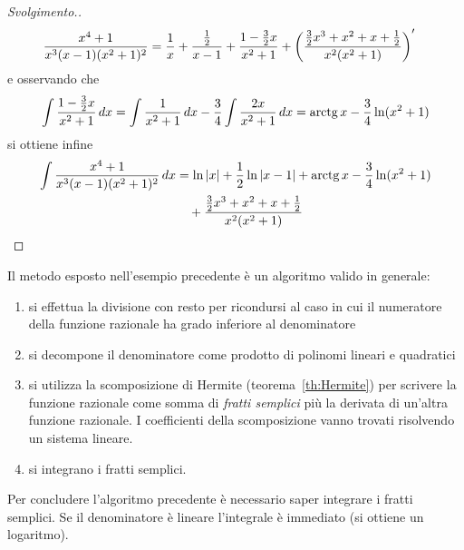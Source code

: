 \begin{proof}[Svolgimento.]
\begin{align*}
\frac{x^4+1}{x^3(x-1)(x^2+1)^2}
&= \frac{1}{x} + \frac{\frac 1 2}{x-1} + \frac{1 - \frac 3 2 x}{x^2+1}
+ {\left( \frac{\frac 3 2 x^3 + x^2 + x + \frac 1 2}{x^2(x^2+1)} \right)}'
\end{align*}
e osservando che
\[
 \int \frac{1 - \frac 3 2 x}{x^2+1}\, dx
 = \int \frac{1}{x^2+1}\, dx - \frac 3 4 \int \frac{2x}{x^2+1}\, dx
 = \operatorname{arctg} x - \frac 3 4 \ln(x^2+1)
\]
si ottiene infine
\begin{align*}
\int \frac{x^4+1}{x^3(x-1)(x^2+1)^2}\, dx
 &= \ln {\left|x\right|} + \frac 1 2 \ln{\left|x-1\right|} + \operatorname{arctg} x - \frac 3 4 \ln(x^2+1) \\
 &\quad + \frac{\frac 3 2 x^3 + x^2+x+\frac 1 2}{x^2(x^2+1)}
\end{align*}
\end{proof}

Il metodo esposto nell'esempio precedente è un algoritmo 
valido in generale:
\begin{enumerate}
  \item si effettua la divisione con resto per ricondursi
  al caso in cui il numeratore della funzione razionale
  ha grado inferiore al denominatore
  \item si decompone il denominatore come prodotto di
  polinomi lineari e quadratici
  \item si utilizza la scomposizione di Hermite (teorema~\ref{th:Hermite})
  per scrivere la funzione razionale come somma di \emph{fratti semplici}
  più la derivata di un'altra funzione razionale. I coefficienti
  della scomposizione vanno trovati risolvendo un sistema lineare.
  \item si integrano i fratti semplici.
\end{enumerate}

Per concludere l'algoritmo precedente è necessario saper integrare i fratti semplici. Se il denominatore è lineare l'integrale è immediato (si ottiene un logaritmo).

